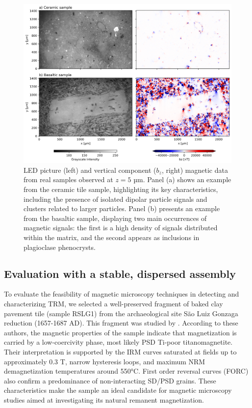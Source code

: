 \begin{figure}[tb!]
  \centering
  \includegraphics[width=1\linewidth]{micromag-interfering-sources/figures/real-data-maps.png}
  \caption{
   LED picture (left) and vertical component (\(b_z\), right) magnetic data from real samples observed at \(z = 5\) µm. Panel (a) shows an example from the ceramic tile sample, highlighting its key characteristics, including the presence of isolated dipolar particle signals and clusters related to larger particles. Panel (b) presents an example from the basaltic sample, displaying two main occurrences of magnetic signals: the first is a high density of signals distributed within the matrix, and the second appears as inclusions in plagioclase phenocrysts.
  }
  \label{real-data-maps}
\end{figure}

\subsection{Evaluation with a stable, dispersed assembly}

To evaluate the feasibility of magnetic microscopy techniques in detecting and characterizing TRM, we selected a well-preserved fragment of baked clay pavement tile (sample RSLG1) from the archaeological site São Luiz Gonzaga reduction (1657-1687 AD). This fragment was studied by \citet{Poletti2016}. According to these authors, the magnetic properties of the sample indicate that magnetization is carried by a low-coercivity phase, most likely PSD Ti-poor titanomagnetite. Their interpretation is supported by the IRM curves saturated at fields up to approximately 0.3 T, narrow hysteresis loops, and maximum NRM demagnetization temperatures around 550°C. First order reversal curves (FORC) also confirm a predominance of non-interacting SD/PSD grains. These characteristics make the sample an ideal candidate for magnetic microscopy studies aimed at investigating its natural remanent magnetization.


